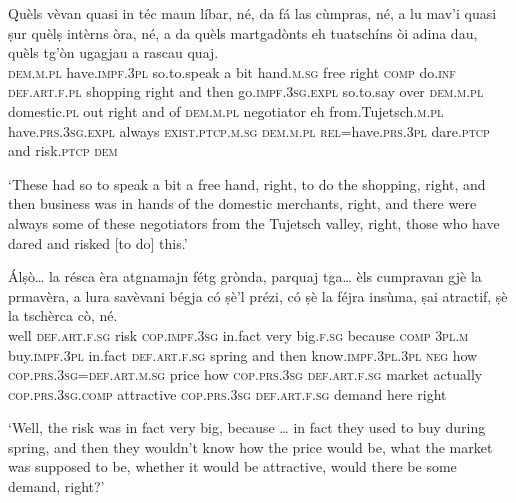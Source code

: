 \begin{linenumbers}
\gll Quèls vèvan quasi in téc maun líbar, né, da fá las cùmpras, né, a lu mav'i quasi ṣur quèlṣ intèrns òra, né, a da quèls martgadònts eh tuatschíns òi adina dau, quèls tg’òn ugagjau a rascau quaj.\\
  \textsc{dem.m.pl} have.\textsc{impf.3pl} so.to.speak a bit hand.\textsc{m.sg} free right \textsc{comp} do.\textsc{inf} \textsc{def.art.f.pl} shopping right and then go.\textsc{impf.3sg.expl} so.to.say over \textsc{dem.m.pl} domestic.\textsc{pl} out right and of \textsc{dem.m.pl}  negotiator eh from.Tujetsch.\textsc{m.pl} have.\textsc{prs.3sg}.\textsc{expl} always \textsc{exist.ptcp.m.sg} \textsc{dem.m.pl} \textsc{rel=}have.\textsc{prs.3pl} dare.\textsc{ptcp} and risk.\textsc{ptcp} \textsc{dem}  \\
\end{linenumbers}
\medskip
\glt `These had so to speak a bit a free hand, right, to do the shopping, right, and then business was in hands of the domestic merchants, right, and there were always some of these negotiators from the Tujetsch valley, right, those who have dared and risked [to do] this.'
\medskip

 \begin{linenumbers}
\gll Álṣò… la résca èra atgnamajn fétg grònda, parquaj tga… èls cumpravan gjè la prmavèra, a lura savèvani bégja có ṣè’l prézi, có ṣè la féjra insùma, ṣai atractif, ṣè la tschèrca cò, né.\\
  well \textsc{def.art.f.sg} risk \textsc{cop.impf.3sg} in.fact very big.\textsc{f.sg} because \textsc{comp} \textsc{3pl.m} buy.\textsc{impf.3pl} in.fact \textsc{def.art.f.sg} spring and then know.\textsc{impf.3pl.3pl} \textsc{neg} how \textsc{cop.prs.3sg=def.art.m.sg} price how \textsc{cop.prs.3sg} \textsc{def.art.f.sg} market actually \textsc{cop.prs.3sg.comp} attractive \textsc{cop.prs.3sg} \textsc{def.art.f.sg} demand here right \\
\end{linenumbers}
\medskip
\glt `Well, the risk was in fact very big, because … in fact they used to buy during spring, and then they wouldn’t know how the price would be, what the market was supposed to be, whether it would be attractive, would there be some demand, right?'
\medskip

